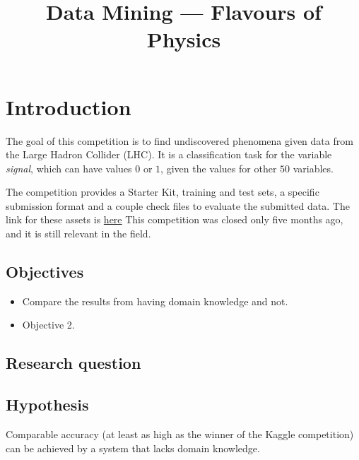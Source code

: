 \documentclass[conference]{IEEEtran}
\begin{document}
\title{Data Mining --- Flavours of Physics}

\author{

}

\maketitle


\begin{abstract}
\end{abstract}


\IEEEpeerreviewmaketitle%


\section{Introduction}
The goal of this competition is to find undiscovered phenomena given data from
the Large Hadron Collider (LHC). It is a classification task for the variable
\textit{signal}, which can have values $0$ or $1$, given the values for other
$50$ variables.

The competition provides a Starter Kit, training and test sets, a specific
submission format and a couple check files to evaluate the submitted data. The
link for these assets is
\href{https://www.kaggle.com/c/flavours-of-physics/data}{here} This competition
was closed only five months ago, and it is still relevant in the field.

\subsection{Objectives}

\begin{itemize}
	\item Compare the results from having domain knowledge and not.
	\item Objective 2. %
\end{itemize}

\subsection{Research question}
\label{sec:researchQuestions}


\subsection{Hypothesis}
\label{sec:hypothesis}
Comparable accuracy (at least as high as the winner of the Kaggle competition)
can be achieved by a system that lacks domain knowledge.
\end{document}
